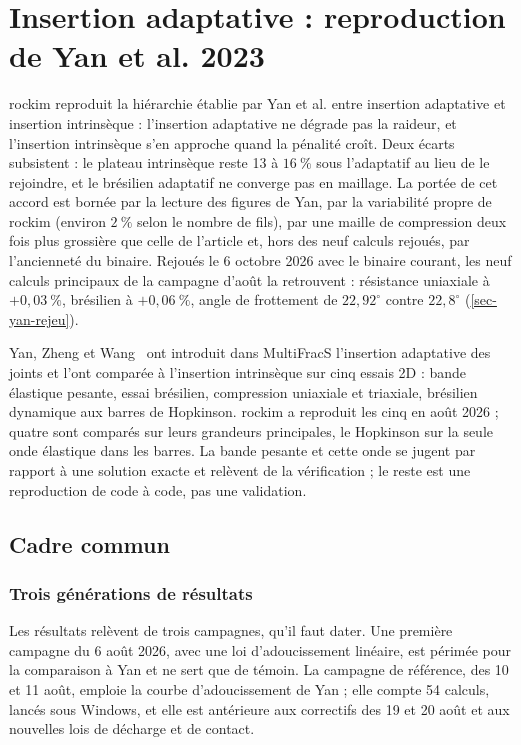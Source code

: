 \section{Insertion adaptative : reproduction de Yan et al. 2023}
\label{sec-yan}

rockim reproduit la hiérarchie établie par Yan et al. entre insertion adaptative et insertion intrinsèque : l'insertion adaptative ne dégrade pas la raideur, et l'insertion intrinsèque s'en approche quand la pénalité croît. Deux écarts subsistent : le plateau intrinsèque reste 13 à $16~\%$ sous l'adaptatif au lieu de le rejoindre, et le brésilien adaptatif ne converge pas en maillage. La portée de cet accord est bornée par la lecture des figures de Yan, par la variabilité propre de rockim (environ $2~\%$ selon le nombre de fils), par une maille de compression deux fois plus grossière que celle de l'article et, hors des neuf calculs rejoués, par l'ancienneté du binaire. Rejoués le 6 octobre 2026 avec le binaire courant, les neuf calculs principaux de la campagne d'août la retrouvent : résistance uniaxiale à $+0{,}03~\%$, brésilien à $+0{,}06~\%$, angle de frottement de $22{,}92^\circ$ contre $22{,}8^\circ$ (\cref{sec-yan-rejeu}).

Yan, Zheng et Wang~\cite{yan2023adaptive} ont introduit dans MultiFracS l'insertion adaptative des joints et l'ont comparée à l'insertion intrinsèque sur cinq essais 2D : bande élastique pesante, essai brésilien, compression uniaxiale et triaxiale, brésilien dynamique aux barres de Hopkinson. rockim a reproduit les cinq en août 2026 ; quatre sont comparés sur leurs grandeurs principales, le Hopkinson sur la seule onde élastique dans les barres. La bande pesante et cette onde se jugent par rapport à une solution exacte et relèvent de la vérification ; le reste est une reproduction de code à code, pas une validation.

\subsection{Cadre commun}

\subsubsection{Trois générations de résultats}

Les résultats relèvent de trois campagnes, qu'il faut dater. Une première campagne du 6 août 2026, avec une loi d'adoucissement linéaire, est périmée pour la comparaison à Yan et ne sert que de témoin. La campagne de référence, des 10 et 11 août, emploie la courbe d'adoucissement de Yan ; elle compte 54 calculs, lancés sous Windows, et elle est antérieure aux correctifs des 19 et 20 août et aux nouvelles lois de décharge et de contact.

